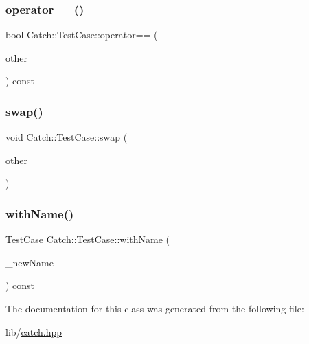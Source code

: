 \hypertarget{class_catch_1_1_test_case_a5456d03a90f75292835c158f3a3374a1}{}\label{class_catch_1_1_test_case_a5456d03a90f75292835c158f3a3374a1} 
\subsubsection{\texorpdfstring{operator==()}{operator==()}}
{\footnotesize\ttfamily bool Catch\+::\+Test\+Case\+::operator== (\begin{DoxyParamCaption}\item[{\hyperlink{class_catch_1_1_test_case}{Test\+Case} const \&}]{other }\end{DoxyParamCaption}) const}

\hypertarget{class_catch_1_1_test_case_aee38f908faf10b905b209ca388275413}{}\label{class_catch_1_1_test_case_aee38f908faf10b905b209ca388275413} 
\subsubsection{\texorpdfstring{swap()}{swap()}}
{\footnotesize\ttfamily void Catch\+::\+Test\+Case\+::swap (\begin{DoxyParamCaption}\item[{\hyperlink{class_catch_1_1_test_case}{Test\+Case} \&}]{other }\end{DoxyParamCaption})}

\hypertarget{class_catch_1_1_test_case_a0812e8a216d09b087d5874687009f0d6}{}\label{class_catch_1_1_test_case_a0812e8a216d09b087d5874687009f0d6} 
\subsubsection{\texorpdfstring{with\+Name()}{withName()}}
{\footnotesize\ttfamily \hyperlink{class_catch_1_1_test_case}{Test\+Case} Catch\+::\+Test\+Case\+::with\+Name (\begin{DoxyParamCaption}\item[{std\+::string const \&}]{\+\_\+new\+Name }\end{DoxyParamCaption}) const}



The documentation for this class was generated from the following file\+:\begin{DoxyCompactItemize}
\item 
lib/\hyperlink{catch_8hpp}{catch.\+hpp}\end{DoxyCompactItemize}
